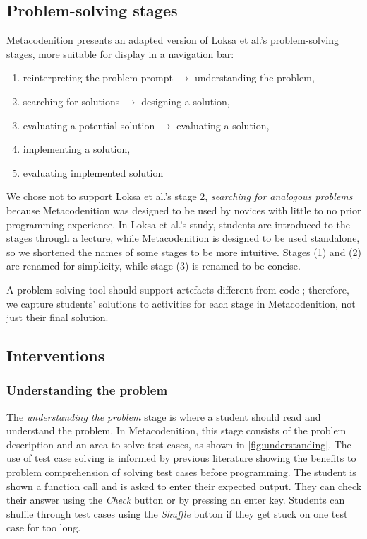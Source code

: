 \documentclass[sigconf,anonymous]{acmart}
\begin{document}
\subsection{Problem-solving stages} \label{sec:design-stages}
Metacodenition presents an adapted version of Loksa et al.'s problem-solving stages, more suitable for display in a navigation bar:
\begin{enumerate}
    \item reinterpreting the problem prompt \(\rightarrow \) understanding the problem,
    \item searching for solutions \(\rightarrow \) designing a solution,
    \item evaluating a potential solution \(\rightarrow \) evaluating a solution,
    \item implementing a solution,
    \item evaluating implemented solution
\end{enumerate}

We chose not to support Loksa et al.'s stage 2, \emph{searching for analogous problems} because Metacodenition was designed to be used 
by novices with little to no prior programming experience. 
In Loksa et al.'s study, students are introduced to the stages through a lecture, while Metacodenition is designed to be used standalone, so we shortened the names of some stages to be more intuitive. Stages (1) and (2) are renamed for simplicity, while stage (3) is renamed to be concise.

A problem-solving tool should support artefacts different from code \cite{saenz2022}; therefore, we capture students' solutions to activities for each stage in Metacodenition, not just their final solution.

\subsection{Interventions} \label{sec:design-interventions}
\subsubsection{Understanding the problem} \label{sec:design-interventions-understanding}
The \emph{understanding the problem} stage is where a student should read and understand the problem. In Metacodenition, this stage consists of the problem description and an area to solve test cases, as shown in \autoref{fig:understanding}. The use of test case solving is informed by previous literature showing the benefits to problem comprehension of solving test cases before programming. The student is shown a function call and is asked to enter their expected output. They can check their answer using the \emph{Check} button or by pressing an enter key. Students can shuffle through test cases using the \emph{Shuffle} button if they get stuck on one test case for too long.
\end{document}
